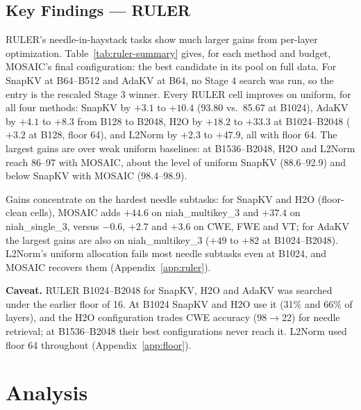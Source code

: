 \documentclass[11pt]{article}
\begin{document}
\subsection{Key Findings — RULER}

RULER's needle-in-haystack tasks show much larger gains from per-layer optimization. Table~\ref{tab:ruler-summary} gives, for each method and budget, MOSAIC's final configuration: the best candidate in its pool on full data. For SnapKV at B64--B512 and AdaKV at B64, no Stage 4 search was run, so the entry is the rescaled Stage 3 winner. Every RULER cell improves on uniform, for all four methods: SnapKV by $+3.1$ to $+10.4$ (93.80 vs.\ 85.67 at B1024), AdaKV by $+4.1$ to $+8.3$ from B128 to B2048, H2O by $+18.2$ to $+33.3$ at B1024--B2048 ($+3.2$ at B128, floor 64), and L2Norm by $+2.3$ to $+47.9$, all with floor 64. The largest gains are over weak uniform baselines: at B1536--B2048, H2O and L2Norm reach 86--97 with MOSAIC, about the level of uniform SnapKV (88.6--92.9) and below SnapKV with MOSAIC (98.4--98.9).

Gains concentrate on the hardest needle subtasks: for SnapKV and H2O (floor-clean cells), MOSAIC adds $+44.6$ on niah\_multikey\_3 and $+37.4$ on niah\_single\_3, versus $-0.6$, $+2.7$ and $+3.6$ on CWE, FWE and VT; for AdaKV the largest gains are also on niah\_multikey\_3 ($+49$ to $+82$ at B1024--B2048). L2Norm's uniform allocation fails most needle subtasks even at B1024, and MOSAIC recovers them (Appendix~\ref{app:ruler}).

\textbf{Caveat.} RULER B1024--B2048 for SnapKV, H2O and AdaKV was searched under the earlier floor of 16. At B1024 SnapKV and H2O use it (31\% and 66\% of layers), and the H2O configuration trades CWE accuracy (98$\rightarrow$22) for needle retrieval; at B1536--B2048 their best configurations never reach it. L2Norm used floor 64 throughout (Appendix~\ref{app:floor}).




\section{Analysis}

\end{document}
